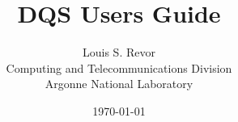 \def\achilles{Sun4/490}
\def\qsub{\mbox{\it qsub}\ }
\def\qstat{\mbox{\it qstat}\ }
\def\group{\mbox{\it group}\ }
\def\queue{\mbox{\it queue}\ }
\def\queues{\mbox{\it queues}\ }
\def\qmaster{\mbox{\it qmaster}\ }
\def\pvm{PVM}

\title{DQS Users Guide}
\author{Louis S. Revor \\
        Computing and Telecommunications Division \\ Argonne National
        Laboratory}
\date{\today}
\maketitle
\newpage









